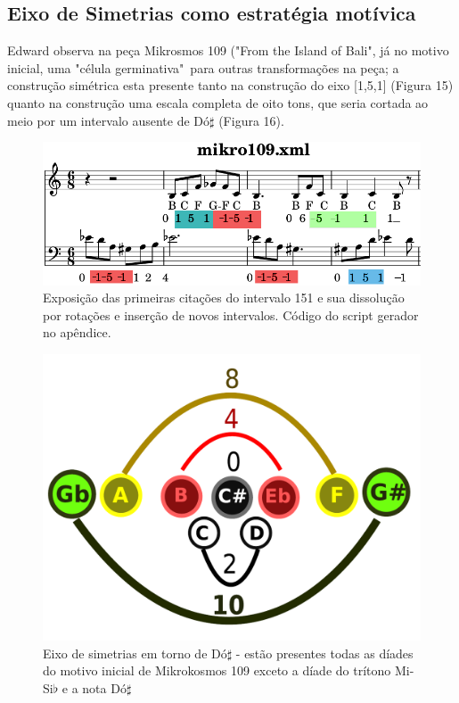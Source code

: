 \documentclass[
	12pt,				%
	openright,			%
	twoside,			%
	a4paper,			%
	english,			%
	french,				%
	spanish,			%
	brazil				%
	]{abntex2}
\begin{document}
\subsection{Eixo de Simetrias como estratégia motívica}

Edward  observa na peça Mikrosmos 109 ("From the Island of Bali", já no motivo inicial, uma "célula germinativa"\ para outras transformações na peça; a construção simétrica esta presente tanto na construção do eixo [1,5,1] (Figura 15) quanto na construção uma escala completa de oito tons, que seria cortada ao meio por um intervalo ausente de Dó$\sharp$ (Figura 16).

\begin{figure}[!h]
	\caption{\label{fig_grafico}Exposição das primeiras citações do intervalo 151 e sua dissolução por rotações e inserção de novos intervalos. Código do script gerador no apêndice.}
	\begin{center}
	    \includegraphics[scale=0.4]{estudosM21/contornoM109.png}
	\end{center}
\end{figure}

\begin{figure}[!h]
	\caption{\label{fig_grafico}Eixo de simetrias em torno de Dó$\sharp$ - estão presentes todas as díades do motivo inicial de Mikrokosmos 109 exceto a díade do trítono Mi-Si$\flat $ e a nota Dó$\sharp$}
	\begin{center}
	    \includegraphics[scale=0.4]{axis/simetriamikro109.pdf}
	\end{center}
\end{figure}
\end{document}
